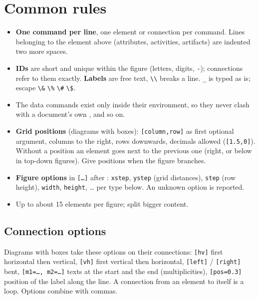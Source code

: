 \section{Common rules}

\begin{itemize}
  \item \textbf{One command per line}, one element or connection per command. Lines belonging to the element above (attributes, activities, artifacts) are indented two more spaces.
  \item \textbf{IDs} are short and unique within the figure (letters, digits, \texttt{-}); connections refer to them exactly. \textbf{Labels} are free text, \texttt{\textbackslash\textbackslash} breaks a line. \texttt{_} is typed as is; escape \texttt{\textbackslash\&} \texttt{\textbackslash\%} \texttt{\textbackslash\#} \texttt{\textbackslash\$}.
  \item The data commands exist only inside their environment, so they never clash with a document's own ,  and so on.
  \item \textbf{Grid positions} (diagrams with boxes): \texttt{[column,row]} as first optional argument, columns to the right, rows downwards, decimals allowed (\texttt{[1.5,0]}). Without a position an element goes next to the previous one (right, or below in top-down figures). Give positions when the figure branches.
  \item \textbf{Figure options} in \texttt{[…]} after : \texttt{xstep}, \texttt{ystep} (grid distances), \texttt{step} (row height), \texttt{width}, \texttt{height}, … per type below. An unknown option is reported.
  \item Up to about 15 elements per figure; split bigger content.
\end{itemize}

\subsection{Connection options}

Diagrams with boxes take these options on their connections: \texttt{[hv]} first horizontal then vertical, \texttt{[vh]} first vertical then horizontal, \texttt{[left]} / \texttt{[right]} bent, \texttt{[m1=…, m2=…]} texts at the start and the end (multiplicities), \texttt{[pos=0.3]} position of the label along the line. A connection from an element to itself is a loop. Options combine with commas.


